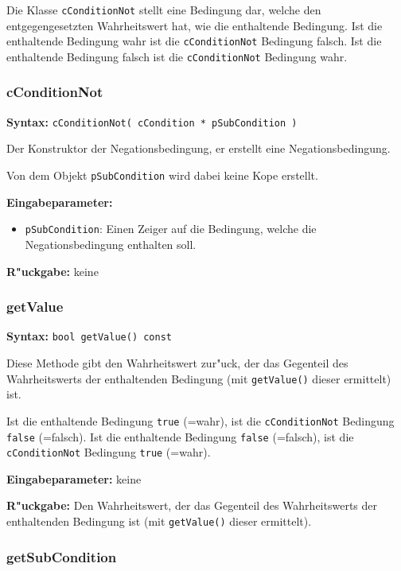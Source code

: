 Die Klasse \verb|cConditionNot| stellt eine Bedingung dar, welche den entgegengesetzten Wahrheitswert hat, wie die enthaltende Bedingung. Ist die enthaltende Bedingung wahr ist die \verb|cConditionNot| Bedingung falsch. Ist die enthaltende Bedingung falsch ist die \verb|cConditionNot| Bedingung wahr.

\subsubsection{cConditionNot}

\bigskip\noindent
\textbf{Syntax:} \verb|cConditionNot( cCondition * pSubCondition )|

\bigskip\noindent
Der Konstruktor der Negationsbedingung, er erstellt eine Negationsbedingung.

Von dem Objekt \verb|pSubCondition| wird dabei keine Kope erstellt.

\bigskip\noindent
\textbf{Eingabeparameter:}
\begin{itemize}
 \item \verb|pSubCondition|: Einen Zeiger auf die Bedingung, welche die Negationsbedingung enthalten soll.
\end{itemize}

\bigskip\noindent
\textbf{R"uckgabe:} keine


\subsubsection{getValue}

\textbf{Syntax:} \verb|bool getValue() const|

\bigskip\noindent
Diese Methode gibt den Wahrheitswert zur"uck, der das Gegenteil des Wahrheitswerts der enthaltenden Bedingung (mit \verb|getValue()| dieser ermittelt) ist.

Ist die enthaltende Bedingung \verb|true| (=wahr), ist die \verb|cConditionNot| Bedingung \verb|false| (=falsch). Ist die enthaltende Bedingung \verb|false| (=falsch), ist die \verb|cConditionNot| Bedingung \verb|true| (=wahr).

\bigskip\noindent
\textbf{Eingabeparameter:} keine

\bigskip\noindent
\textbf{R"uckgabe:} Den Wahrheitswert, der das Gegenteil des Wahrheitswerts der enthaltenden Bedingung ist (mit \verb|getValue()| dieser ermittelt).


\subsubsection{getSubCondition}

